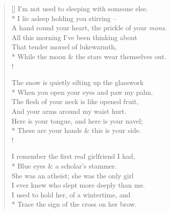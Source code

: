 \settowidth{\versewidth}{I'm not used to sleeping with someone else.}
\begin{verse}[\versewidth]
I'm not used to sleeping with someone else.\\*
\vin I lie  asleep holding you stirring --\\
A hand round your heart, the prickle of your \textit{mons}.\\
\vin All this morning I've been thinking about\\
That tender morsel of lukewarmth,\\*
\vin While the moon \& the stars wear themselves out.\nobreak\\!

The snow is quietly silting up the glasswork\\*
\vin When you open your eyes and paw my palm.\\
The flesh of your neck is like opened fruit,\\
\vin And your arms around my waist hurt.\\
Here is your tongue, and here is your navel;\\*
\vin These are your hands \& this is your side.\\!

I remember the first real girlfriend I had,\\*
\vin Blue eyes \& a scholar's stammer.\\
She was an atheist; she was the only girl\\
\vin I ever knew who slept more deeply than me.\\
I used to hold her, of a wintertime, and\\*
\vin Trace the sign of the cross on her brow.
\end{verse}
